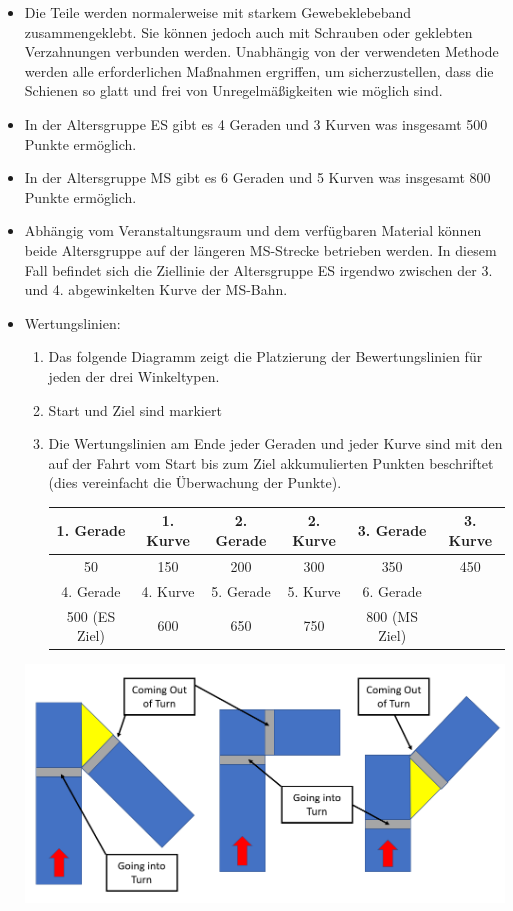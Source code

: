 \documentclass[a4paper,12pt]{article}
\begin{document}
\begin{itemize}
	\item Die Teile werden normalerweise mit starkem Gewebeklebeband
		zusammengeklebt. Sie können jedoch auch mit Schrauben oder
		geklebten Verzahnungen verbunden werden. Unabhängig von der
		verwendeten Methode werden alle erforderlichen Maßnahmen
		ergriffen, um sicherzustellen, dass die Schienen so glatt und
		frei von Unregelmäßigkeiten wie möglich sind.
	\item In der Altersgruppe ES gibt es 4 Geraden und 3 Kurven was
		insgesamt 500 Punkte ermöglich.
	\item In der Altersgruppe MS gibt es 6 Geraden und 5 Kurven was
		insgesamt 800 Punkte ermöglich.
	\item Abhängig vom Veranstaltungsraum und dem verfügbaren Material
		können beide Altersgruppe auf der längeren MS-Strecke betrieben
		werden. In diesem Fall befindet sich die Ziellinie der
		Altersgruppe ES irgendwo zwischen der 3. und 4. abgewinkelten
		Kurve der MS-Bahn.
	\item Wertungslinien:
		\begin{enumerate}
			\item Das folgende Diagramm zeigt die Platzierung der
				Bewertungslinien für jeden der drei
				Winkeltypen.
			\item Start und Ziel sind markiert
			\item Die Wertungslinien am Ende jeder Geraden und
				jeder Kurve sind mit den auf der Fahrt vom
				Start bis zum Ziel akkumulierten Punkten
				beschriftet (dies vereinfacht die Überwachung
				der Punkte).
				\begin{center}
					\begin{tabular}{|c|c|c|c|c|c|} \hline
						\rowcolor{Gray}
						1. Gerade & 1. Kurve & 2. Gerade & 2. Kurve & 3. Gerade & 3. Kurve  \\ \hline
						50 & 150 & 200 & 300 & 350 & 450  \\ \hline
						\rowcolor{Gray}
						4. Gerade & 4. Kurve & 5. Gerade & 5. Kurve & 6. Gerade & \\ \hline
						500 (ES Ziel) & 600 & 650 & 750 & 800 (MS Ziel) & \\ \hline
					\end{tabular}
				\end{center}
		\end{enumerate}
		\includegraphics[width=1.0\textwidth]{amazeing_angle.png}
\end{itemize}
\end{document}
